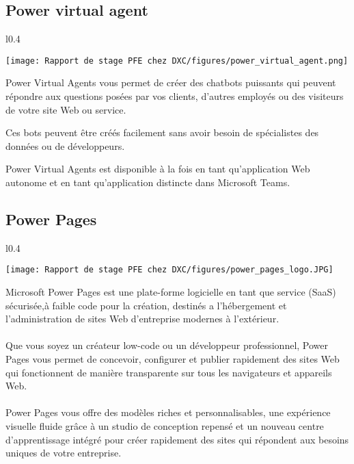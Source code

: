 \subsection{Power virtual agent }

\begin{wrapfigure}{l}{0.4\textwidth}
  \begin{center}
    \texttt{[image: Rapport de stage PFE chez DXC/figures/power\_virtual\_agent.png]}
  \end{center}
\end{wrapfigure}

Power Virtual Agents vous permet de créer des chatbots puissants qui peuvent répondre aux questions posées par vos clients, d’autres employés ou des visiteurs de votre site Web ou service.

Ces bots peuvent être créés facilement sans avoir besoin de spécialistes des données ou de développeurs.

Power Virtual Agents est disponible à la fois en tant qu’application Web autonome et en tant qu’application distincte dans Microsoft Teams.

\subsection{Power Pages}

\begin{wrapfigure}{l}{0.4\textwidth}
  \begin{center}
    \texttt{[image: Rapport de stage PFE chez DXC/figures/power\_pages\_logo.JPG]}
  \end{center}
\end{wrapfigure}

Microsoft Power Pages est une plate-forme logicielle en tant que service (SaaS) sécurisée,à faible code pour la création, destinés a l'hébergement et l'administration de sites Web d'entreprise modernes à l'extérieur. 
\\\\
Que vous soyez un créateur low-code ou un développeur professionnel, Power Pages vous permet de concevoir, configurer et publier rapidement des sites Web qui fonctionnent de manière transparente sur tous les navigateurs et appareils Web.
\\\\
Power Pages vous offre des modèles riches et personnalisables, une expérience visuelle fluide grâce à un studio de conception repensé et un nouveau centre d'apprentissage intégré pour créer rapidement des sites qui répondent aux besoins uniques de votre entreprise.

